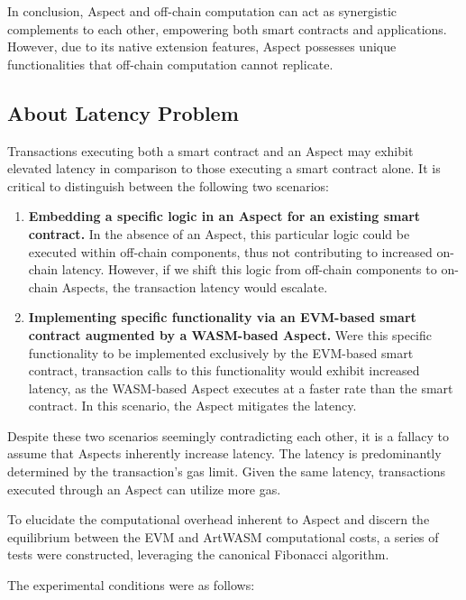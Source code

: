 In conclusion, Aspect and off-chain computation can act as synergistic complements to each other, empowering both smart contracts and applications. However, due to its native extension features, Aspect possesses unique functionalities that off-chain computation cannot replicate.

\subsection{About Latency Problem}

Transactions executing both a smart contract and an Aspect may exhibit elevated latency in comparison to those executing a smart contract alone. It is critical to distinguish between the following two scenarios:

\begin{enumerate}
  \item \textbf{Embedding a specific logic in an Aspect for an existing smart contract.} In the absence of an Aspect, this particular logic could be executed within off-chain components, thus not contributing to increased on-chain latency. However, if we shift this logic from off-chain components to on-chain Aspects, the transaction latency would escalate.
  \item \textbf{Implementing specific functionality via an EVM-based smart contract augmented by a WASM-based Aspect.} Were this specific functionality to be implemented exclusively by the EVM-based smart contract, transaction calls to this functionality would exhibit increased latency, as the WASM-based Aspect executes at a faster rate than the smart contract. In this scenario, the Aspect mitigates the latency.
\end{enumerate}

Despite these two scenarios seemingly contradicting each other, it is a fallacy to assume that Aspects inherently increase latency. The latency is predominantly determined by the transaction's gas limit. Given the same latency, transactions executed through an Aspect can utilize more gas.

To elucidate the computational overhead inherent to Aspect and discern the equilibrium between the EVM and ArtWASM computational costs, a series of tests were constructed, leveraging the canonical Fibonacci algorithm.

The experimental conditions were as follows:

